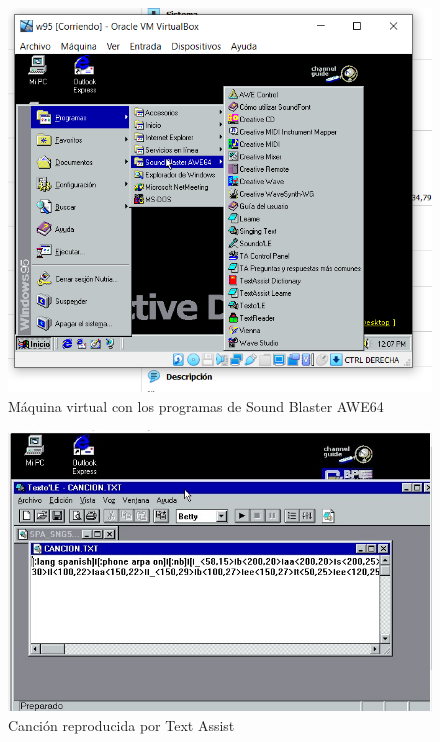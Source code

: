 \documentclass{article}
\begin{document}
\begin{figure}[h!]
    \centering
    \includegraphics[scale=0.8]{images/programas_SOUNDBLASTER.jpg}
    \caption{Máquina virtual con los programas de Sound Blaster AWE64}
    \label{fig:programas}
\end{figure}

\begin{figure}[h!]
    \centering
    \includegraphics[scale=0.8]{images/textassist_canciontxt.jpg}
    \caption{Canción reproducida por Text Assist}
    \label{fig:prog_canc}
\end{figure}
\end{document}
